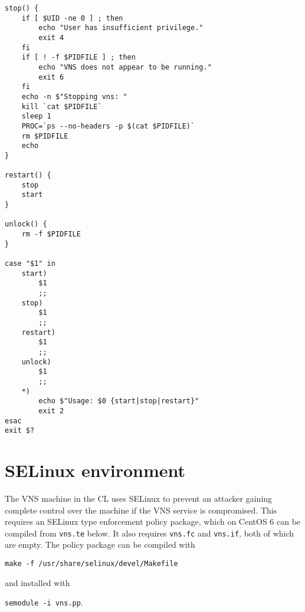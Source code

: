\documentclass[a4paper,12pt]{report}
\begin{document}
\begin{verbatim}
stop() {
    if [ $UID -ne 0 ] ; then
        echo "User has insufficient privilege."
        exit 4
    fi
    if [ ! -f $PIDFILE ] ; then
        echo "VNS does not appear to be running."
        exit 6
    fi
    echo -n $"Stopping vns: "
    kill `cat $PIDFILE`
    sleep 1
    PROC=`ps --no-headers -p $(cat $PIDFILE)`
    rm $PIDFILE
    echo
}

restart() {
    stop
    start
}

unlock() {
    rm -f $PIDFILE
}

case "$1" in
    start)
        $1
        ;;
    stop)
        $1
        ;;
    restart)
        $1
        ;;
    unlock)
        $1
        ;;
    *)
        echo $"Usage: $0 {start|stop|restart}"
        exit 2
esac
exit $?
\end{verbatim}
\normalsize


\chapter{SELinux environment}
The VNS machine in the CL uses SELinux to prevent an attacker gaining complete control over the machine if the VNS service is compromised.  This requires an SELinux type enforcement policy package, which on CentOS 6 can be compiled from \texttt{vns.te} below.  It also requires \texttt{vns.fc} and \texttt{vns.if}, both of which are empty.  The policy package can be compiled with

\texttt{make -f /usr/share/selinux/devel/Makefile}

and installed with

\texttt{semodule -i vns.pp}.
\end{document}

